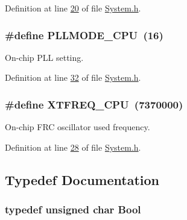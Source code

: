 Definition at line \hyperlink{a00072_source_l00020}{20} of file \hyperlink{a00072_source}{System.\+h}.

\hypertarget{a00072_a0d6b8c656533d3c815daa9d575998950}{
\subsubsection[{P\+L\+L\+M\+O\+D\+E\+\_\+\+C\+P\+U}]{\setlength{\rightskip}{0pt plus 5cm}\#define P\+L\+L\+M\+O\+D\+E\+\_\+\+C\+P\+U~(16)}}\label{a00072_a0d6b8c656533d3c815daa9d575998950}


On-\/chip P\+L\+L setting. 



Definition at line \hyperlink{a00072_source_l00032}{32} of file \hyperlink{a00072_source}{System.\+h}.

\hypertarget{a00072_a719092b960b832b468fd401ed27b9003}{
\subsubsection[{X\+T\+F\+R\+E\+Q\+\_\+\+C\+P\+U}]{\setlength{\rightskip}{0pt plus 5cm}\#define X\+T\+F\+R\+E\+Q\+\_\+\+C\+P\+U~(7370000)}}\label{a00072_a719092b960b832b468fd401ed27b9003}


On-\/chip F\+R\+C oscillator used frequency. 



Definition at line \hyperlink{a00072_source_l00028}{28} of file \hyperlink{a00072_source}{System.\+h}.



\subsection{Typedef Documentation}
\hypertarget{a00072_a253b248072cfc8bd812c69acd0046eed}{
\subsubsection[{Bool}]{\setlength{\rightskip}{0pt plus 5cm}typedef unsigned char {\bf Bool}}}\label{a00072_a253b248072cfc8bd812c69acd0046eed}


